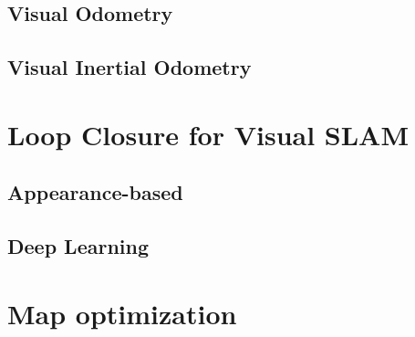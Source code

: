 \subsection{Visual Odometry}

\subsection{Visual Inertial Odometry}


\section{Loop Closure for Visual SLAM}

\subsection{Appearance-based}

\subsection{Deep Learning}


\section{Map optimization}



\filbreak